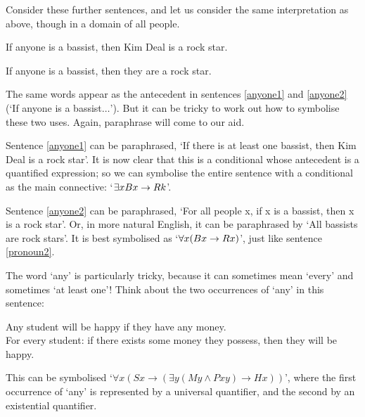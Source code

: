 Consider these further sentences, and let us consider the same interpretation as above, though in a domain of all people.
	\begin{earg}
		\item[\ex{anyone1}] If anyone is a bassist, then Kim Deal is a rock star.
		\item[\ex{anyone2}] If anyone is a bassist, then they are a rock star.
	\end{earg}
The same words appear as the antecedent in sentences \ref{anyone1} and \ref{anyone2}  (`If anyone is a bassist$…$'). But it can be tricky to work out how to symbolise these two uses. Again, paraphrase will come to our aid. 

Sentence \ref{anyone1} can be paraphrased, `If there is at least one bassist, then Kim Deal is a rock star'. It is now clear that this is a conditional whose antecedent is a quantified expression; so we can symbolise the entire sentence with a conditional as the main connective: `$\exists x Bx \rightarrow Rk$'. 

Sentence \ref{anyone2} can be paraphrased, `For all people x, if x is a bassist, then x is a rock star'. Or, in more natural English, it can be paraphrased by `All bassists are rock stars'. It is best symbolised as `$\forall x(Bx \rightarrow Rx)$', just like sentence \ref{pronoun2}.

The word `any' is particularly tricky, because it can sometimes mean `every' and sometimes `at least one'! Think about the two occurrences of `any' in this sentence: \begin{earg}
\item[\ex{student.any}] Any student will be happy if they have any money.\\
 For every student: if there exists some money they possess, then they will  be happy.
\end{earg} This can be symbolised `$\forall x (Sx \to (\exists y (My \wedge Pxy) \to Hx))$', where the first occurrence of `any' is represented by a universal quantifier, and the second by an existential quantifier.  

